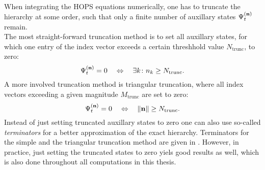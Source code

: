 When integrating the HOPS equations numerically, one has to truncate the hierarchy at some order,
such that only a finite number of auxillary states $\Psi_t^{(\vectorbold{n})}$ remain. \\
The most straight-forward truncation method is to set all auxillary states, for which
one entry of the index vector exceeds a certain threshhold value $N_\text{trunc}$, to zero:
\begin{equation*}
    \Psi_t^{(\vectorbold{n})} = 0 \quad \Leftrightarrow \quad \exists k \colon n_k \ge N_\text{trunc}.
\end{equation*}
A more involved truncation method is triangular truncation, where all index vectors exceeding
a given magnitude $M_\text{trunc}$ are set to zero:
\begin{equation*}
    \Psi_t^{(\vectorbold{n})} = 0 \quad \Leftrightarrow \quad \norm{\vectorbold{n}} \ge N_\text{trunc}.
\end{equation*}
Instead of just setting truncated auxillary states to zero one can also use so-called 
\textit{terminators} for a better approximation of the exact hierarchy. Terminators for the
simple and the triangular truncation method are given in \cite{Suess:2014}. However, in practice,
just setting the truncated states to zero yiels good results as well, which is also done 
throughout all computations in this thesis.